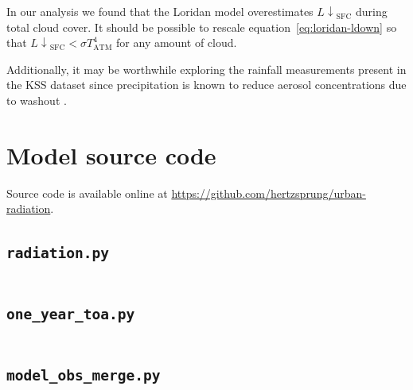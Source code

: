 \documentclass[a4paper,titlepage, twoside]{report}
\newcommand\Ldownsfc{{L\!\!\downarrow}_\mathrm{SFC}}
\begin{document}
In our analysis we found that the Loridan model overestimates $\Ldownsfc$ during total cloud cover.  It should be possible to rescale equation~\ref{eq:loridan-ldown} so that $\Ldownsfc<\sigma T_\mathrm{ATM}^4$ for any amount of cloud.

Additionally, it may be worthwhile exploring the rainfall measurements present in the KSS dataset since precipitation is known to reduce aerosol concentrations due to washout \parencite{loosmore}.

\printbibliography

\appendix
\chapter{Model source code}
Source code is available online at \url{https://github.com/hertzsprung/urban-radiation}.

\section{\texttt{radiation.py}}
\inputminted[fontsize=\footnotesize, tabsize=4]{python}{radiation.py}

\section{\texttt{one\_year\_toa.py}}
\inputminted[fontsize=\footnotesize, tabsize=4]{python}{one_year_toa.py}

\section{\texttt{model\_obs\_merge.py}}
\inputminted[fontsize=\footnotesize, tabsize=4]{python}{model_obs_merge.py}
\end{document}
